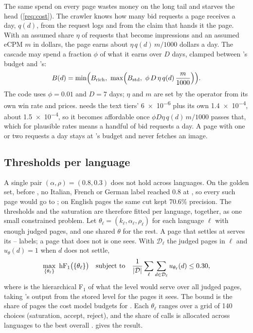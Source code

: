 The same spend on every page wastes money on the long tail and starves the head (\ref{req:cost}). The crawler knows how many bid requests a page receives a day, $q(d)$, from the request logs and from the claim that hands it the page. With an assumed share $\eta$ of requests that become impressions and an assumed eCPM $m$ in dollars, the page earns about $\eta\, q(d)\, m / 1000$ dollars a day. The cascade may spend a fraction $\phi$ of what it earns over $D$ days, clamped between 's budget and 's:
\begin{equation}\label{eq:cascade-budget}
  B(d) = \min\Bigl(B_{\mathrm{rich}},\ \max\Bigl(B_{\mathrm{std}},\ \phi \, D\, \eta\, q(d)\, \frac{m}{1000}\Bigr)\Bigr).
\end{equation}
The code uses $\phi = 0.01$ and $D = 7$ days; $\eta$ and $m$ are set by the operator from its own win rate and prices.  needs the text tiers' \num{6e-6} plus its own \num{1.4e-4}, about \num{1.5e-4}, so it becomes affordable once $\phi D \eta\, q(d)\, m/1000$ passes that, which for plausible rates means a handful of bid requests a day. A page with one or two requests a day stays at 's budget and never fetches an image.

\subsection{Thresholds per language}\label{sec:cascade-tunings}

A single pair $(\alpha, \rho) = (0.8, 0.3)$ does not hold across languages. On the golden set, before , no Italian, French or German label reached 0.8 at , so every such page would go to ; on English pages the same cut kept 70.6\% precision. The thresholds and the  saturation are therefore fitted per language, together, as one small constrained problem. Let $\theta_\ell = (k_\ell, \alpha_\ell, \rho_\ell)$ for each language $\ell$ with enough judged pages, and one shared $\theta$ for the rest. A page that settles at  serves its -- labels; a page that does not is one  sees. With $\mathcal{D}_\ell$ the judged pages in $\ell$ and $u_\theta(d) = 1$ when $d$ does not settle,
\begin{equation}\label{eq:cascade-fit}
  \max_{\{\theta_\ell\}}\ \mathrm{hF}_1\bigl(\{\theta_\ell\}\bigr)
  \quad\text{subject to}\quad
  \frac{1}{|\mathcal{D}|}\sum_\ell \sum_{d \in \mathcal{D}_\ell} u_{\theta_\ell}(d) \le 0.30,
\end{equation}
where \hF{} is the hierarchical F$_1$ of what the  level would serve over all judged pages, taking 's output from the stored  level for the pages it sees. The bound is the share of pages the cost model budgets for . Each $\theta_\ell$ ranges over a grid of 140 choices (saturation, accept, reject), and the share of  calls is allocated across languages to the best overall \hF.  gives the result.

